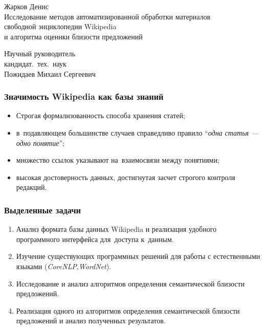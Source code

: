 \documentclass{beamer}
\begin{document}
\sloppy

\begin{frame}
\begin{center}
Жарков Денис\\
\vspace{1cm}
{\Large Исследование методов автоматизированной обработки материалов \\ 
свободной энциклопедии Wikipedia\\
и алгоритма оценнки близости предложений}
\end{center}
\begin{tabbing}
\hspace{6.5cm} \= Научный руководитель\\
\> кандидат.~тех.~наук\\
\> Пожидаев Михаил Сергеевич\\
\end{tabbing}
\end{frame}

\begin{frame}
\frametitle{Значимость Wikipedia как базы знаний}

\begin{itemize}
\item{
Строгая формализованность способа хранения статей;
}
\item{
в~подавляющем большинстве случаев справедливо
правило ``\textit{одна статья --- одно понятие}'';
}
\item{
множество ссылок указывают на~взаимосвязи между понятиями;
}
\item{
высокая достоверность данных, достигнутая засчет строгого контроля редакций.
}
\end{itemize}
\end{frame}

\begin{frame}
\frametitle{Выделенные задачи}
\begin{enumerate}
\item {
Анализ формата базы данных Wikipedia и реализация удобного программного интерфейса 
для~доступа к~данным.
}
\item {
Изучение существующих программных решений для работы с естественными языками (\textit{CoreNLP},\textit{WordNet}).
}
\item {
Исследование и анализ алгоритмов определения семантической близости предложений.
}
\item{
Реализация одного из алгоритмов определения семантической близости предложений и
анализ полученных результатов.
}
\end{enumerate}
\end{frame}
\end{document}
